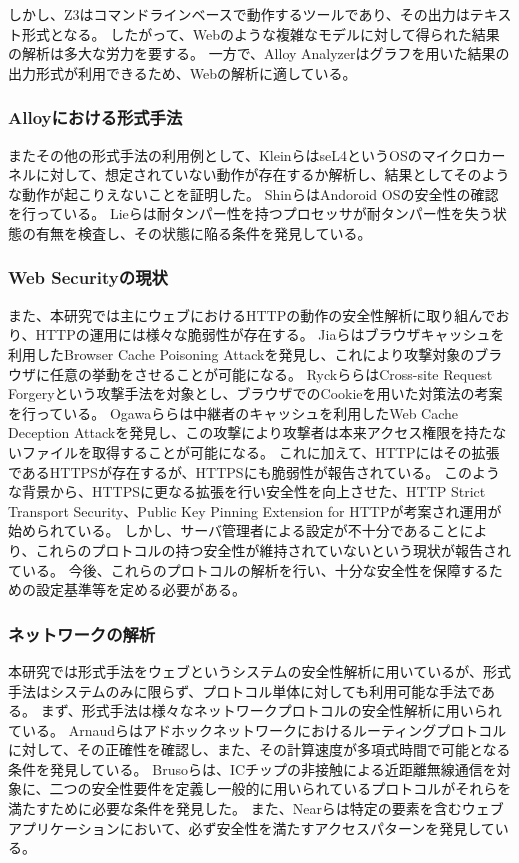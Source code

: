 \documentclass[journal]{IEEEtran}
\begin{document}
しかし、Z3はコマンドラインベースで動作するツールであり、その出力はテキスト形式となる。
したがって、Webのような複雑なモデルに対して得られた結果の解析は多大な労力を要する。
一方で、Alloy Analyzerはグラフを用いた結果の出力形式が利用できるため、Webの解析に適している。

\subsubsection{Alloyにおける形式手法}
またその他の形式手法の利用例として、Kleinら\cite{sel4_formal_verification_of_an}はseL4というOSのマイクロカーネルに対して、想定されていない動作が存在するか解析し、結果としてそのような動作が起こりえないことを証明した。
Shinら\cite{towards_formal_analysis_of_the}はAndoroid OSの安全性の確認を行っている。
Lieら\cite{specifying_and_verifying_hardware_for_tamper}は耐タンパー性を持つプロセッサが耐タンパー性を失う状態の有無を検査し、その状態に陥る条件を発見している。

\subsubsection{Web Securityの現状}
また、本研究では主にウェブにおけるHTTPの動作の安全性解析に取り組んでおり、HTTPの運用には様々な脆弱性が存在する。
Jiaら\cite{bcpattack}はブラウザキャッシュを利用したBrowser Cache Poisoning Attackを発見し、これにより攻撃対象のブラウザに任意の挙動をさせることが可能になる。
Ryckら\cite{cookie-model}らはCross-site Request Forgeryという攻撃手法を対象とし、ブラウザでのCookieを用いた対策法の考案を行っている。
Ogawaら\cite{WCD}らは中継者のキャッシュを利用したWeb Cache Deception Attackを発見し、この攻撃により攻撃者は本来アクセス権限を持たないファイルを取得することが可能になる。
これに加えて、HTTPにはその拡張であるHTTPSが存在するが、HTTPSにも脆弱性が報告されている\cite{poodle}。
このような背景から、HTTPSに更なる拡張を行い安全性を向上させた、HTTP Strict Transport Security\cite{hsts}、Public Key Pinning Extension for HTTP\cite{hpkp}が考案され運用が始められている。
しかし、サーバ管理者による設定が不十分であることにより、これらのプロトコルの持つ安全性が維持されていないという現状が報告されている\cite{hstshpkp}。
今後、これらのプロトコルの解析を行い、十分な安全性を保障するための設定基準等を定める必要がある。

\subsubsection{ネットワークの解析}
本研究では形式手法をウェブというシステムの安全性解析に用いているが、形式手法はシステムのみに限らず、プロトコル単体に対しても利用可能な手法である。
まず、形式手法は様々なネットワークプロトコルの安全性解析に用いられている。
Arnaudら\cite{modeling-and-verifying-ad-hoc}はアドホックネットワークにおけるルーティングプロトコルに対して、その正確性を確認し、また、その計算速度が多項式時間で可能となる条件を発見している。
Brusoら\cite{formal-verification-of-privacy-for}は、ICチップの非接触による近距離無線通信\cite{formal-verification-of-privacy-for}を対象に、二つの安全性要件を定義し一般的に用いられているプロトコルがそれらを満たすために必要な条件を発見した。
また、Nearら\cite{finding_security_bugs_in_web}は特定の要素を含むウェブアプリケーションにおいて、必ず安全性を満たすアクセスパターンを発見している。
\end{document}
